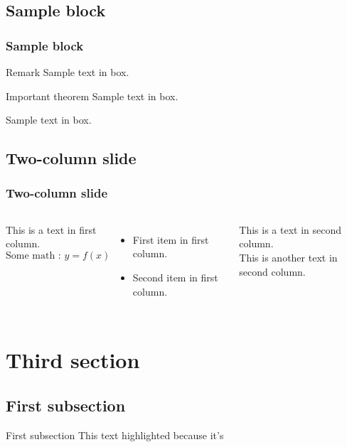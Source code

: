 \documentclass{beamer}
\begin{document}
\subsection{Sample block}
\begin{frame}
    \frametitle{Sample block}
    \begin{block}{Remark}
        Sample text in box.
    \end{block} 
        
    \begin{alertblock}{Important theorem}
        Sample text in box.
    \end{alertblock}
        
    \begin{examples}
        Sample text in box.
    \end{examples}
\end{frame}
    
\subsection{Two-column slide}
\begin{frame}
    \frametitle{Two-column slide}
    \begin{columns}
    This is a text in first column. \[\mbox{Some math : }y=f(x)\]
        \begin{itemize}
            \item First item in first column.
            \item Second item in first column.
        \end{itemize}
    
    This is a text in second column. \\
    This is another text in second column. 
    \end{columns}
\end{frame}


\section{Third section}
\subsection{First subsection}
\begin{frame}{First subsection}
    \alert{This text highlighted} because it's \color{red}{important.}
\end{frame}
\end{document}
